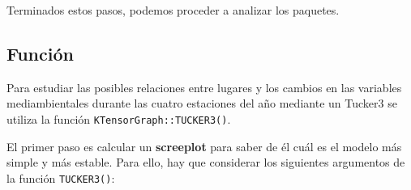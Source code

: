\documentclass[
  spanish,
]{article}
\begin{document}
Terminados estos pasos, podemos proceder a analizar los paquetes.

\hypertarget{funciuxf3n}{%
\subsection{Función}\label{funciuxf3n}}

Para estudiar las posibles relaciones entre lugares y los cambios en las variables mediambientales durante las cuatro estaciones del año mediante un Tucker3 se utiliza la función \texttt{KTensorGraph::TUCKER3()}.

El primer paso es calcular un \textbf{screeplot} para saber de él cuál es el modelo más simple y más estable. Para ello, hay que considerar los siguientes argumentos de la función \texttt{TUCKER3()}:
\end{document}
